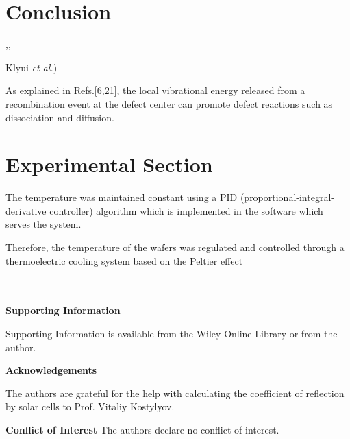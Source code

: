 \documentclass{WileyMSP-template}
\begin{document}
\section{Conclusion}\label{SecConsl}
\cite{KLAASSEN953,ROUGIEUX2018,FeB:kinetic},\cite{Brad2022,AugerSi2022,EBLSHADE},

Klyui \emph{et al.}\cite{KostRefl2000})

As explained in Refs.[6,21], the local vibrational energy released
from a recombination event at the defect center can promote defect reactions such as dissociation
and diffusion.


\section{Experimental Section}
\label{SecExp}

The temperature was maintained constant using a PID (proportional-integral-derivative controller) algorithm which is implemented in the software which serves the system.

Therefore, the temperature of the
wafers was regulated and controlled through a thermoelectric
cooling system based on the Peltier effect

\\
\\



\medskip
\textbf{Supporting Information} \par %
Supporting Information is available from the Wiley Online Library or from the author.



\medskip
\textbf{Acknowledgements} \par %
The authors are grateful for the help with calculating the coefficient of reflection by solar cells to Prof. Vitaliy Kostylyov.

\medskip
\textbf{Conflict of Interest}
The authors declare no conflict of interest.

\medskip




\end{document}
